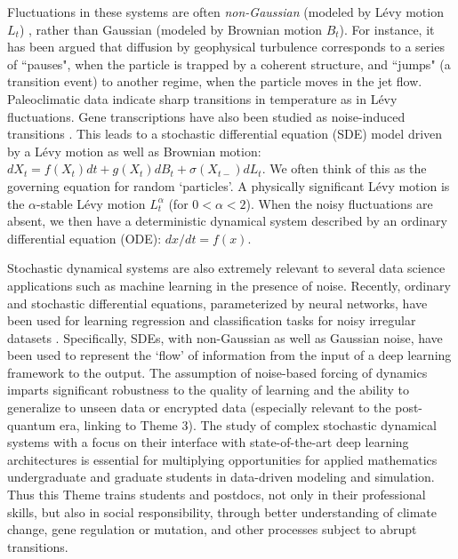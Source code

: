 \documentclass[11pt]{NSFamsart}
\begin{document}
Fluctuations in these  systems are often \emph{non-Gaussian} (modeled by L\'evy motion $L_t$) \cite{Woy,Dit, Shlesinger,taqqu,dybiec2009levy}, rather than Gaussian (modeled by Brownian motion $B_t$). For instance, it has been argued that diffusion by geophysical turbulence \cite{Shlesinger}
corresponds  to a series of  ``pauses", when the
particle is trapped by a coherent structure, and  
``jumps" (a transition event) to another regime, when the particle moves in the jet
flow. Paleoclimatic data \cite{Dit, ZhengYY2020}   indicate   sharp transitions in temperature as in L\'evy fluctuations. Gene transcriptions have also been studied as noise-induced transitions \cite{Raser2005,Suel06,Lin2016GeneED, ChenWuDuan}. 
This leads to a
 stochastic   differential equation (SDE)  model \cite{Arnold,   Oksendal, DuanBook2015, Applebaum}
 driven by a L\'evy motion as well as Brownian motion:
 $
 dX_t= f(X_t) dt + g(X_t) dB_t + \sigma(X_{t-}) dL_t.
 $
 We often think of this as the governing equation for random `particles'. A physically significant L\'evy motion is the  $\alpha$-stable L\'evy motion $L_t^\alpha$ (for $0<\alpha<2$).  
 When the noisy fluctuations are absent, we then have a   deterministic  dynamical system described by an ordinary differential equation (ODE): $ dx/dt=f(x).$
 
 
Stochastic dynamical systems are also extremely relevant to several data science applications such as machine learning in the presence of  noise. Recently, ordinary and stochastic differential equations, parameterized by neural networks, have been used for learning regression and classification tasks for noisy irregular datasets \cite{chen2018neural,rubanova2019latent,jia2019neural,tzen2019neural,look2020deterministic,liu2019neural}. Specifically, SDEs, with non-Gaussian as well as Gaussian noise, have been used to represent the `flow' of information from the input of a deep learning framework to the output. The assumption of noise-based forcing of dynamics imparts significant robustness to the quality of learning and the ability to generalize to unseen data or encrypted data (especially relevant to the post-quantum era, linking to Theme 3). The study of complex stochastic dynamical systems with a focus on their interface with state-of-the-art deep learning architectures is essential for multiplying opportunities for applied mathematics undergraduate and graduate students in data-driven modeling and simulation. 
Thus this Theme   trains students and postdocs, not only in their professional skills,  but also in social responsibility, through better understanding of climate change, gene regulation or mutation,  and other processes subject to abrupt transitions.
\end{document}
